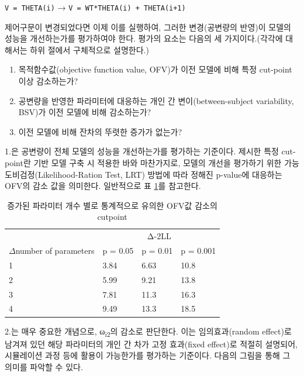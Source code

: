 \documentclass[
  11pt,
  krantz2,
  a4paper]{krantz}
\providecommand{\tightlist}{%
  \setlength{\itemsep}{0pt}\setlength{\parskip}{0pt}}
\theoremstyle{definition}
\theoremstyle{definition}
\theoremstyle{definition}
\theoremstyle{remark}
\begin{document}
\texttt{V\ =\ THETA(i)} → \texttt{V\ =\ WT*THETA(i)\ +\ THETA(i+1)}

제어구문이 변경되었다면 이제 이를 실행하여, 그러한 변경(공변량의 반영)이 모델의 성능을 개선하는가를 평가하여야 한다. 평가의 요소는 다음의 세 가지이다.(각각에 대해서는 하위 절에서 구체적으로 설명한다.)

\begin{enumerate}
\def\labelenumi{\arabic{enumi}.}
\tightlist
\item
  목적함수값(objective function value, OFV)가 이전 모델에 비해 특정 cut-point 이상 감소하는가?
\item
  공변량을 반영한 파라미터에 대응하는 개인 간 변이(between-subject variability, BSV)가 이전 모델에 비해 감소하는가?
\item
  이전 모델에 비해 잔차의 뚜렷한 증가가 없는가?
\end{enumerate}

1.은 공변량이 전체 모델의 성능을 개선하는가를 평가하는 기준이다. 제시한 특정 cut-point란 기반 모델 구축 시 적용한 바와 마찬가지로, 모델의 개선을 평가하기 위한 가능도비검정(Likelihood-Ration Test, LRT) 방법에 따라 정해진 p-value에 대응하는 OFV의 감소 값을 의미한다. 일반적으로 표 \ref{tab:cutpoint-param}를 참고한다.

\begin{table}

\caption{\label{tab:cutpoint-param}증가된 파라미터 개수 별로 통계적으로 유의한 OFV값 감소의 cutpoint}
\centering
\begin{tabular}[t]{llll}
\toprule
\multicolumn{1}{c}{ } & \multicolumn{3}{c}{Δ-2LL} \\
\cmidrule(l{3pt}r{3pt}){2-4}
$\Delta$number of parameters & p = 0.05 & p = 0.01 & p = 0.001\\
\midrule
1 & 3.84 & 6.63 & 10.8\\
2 & 5.99 & 9.21 & 13.8\\
3 & 7.81 & 11.3 & 16.3\\
4 & 9.49 & 13.3 & 18.5\\
\bottomrule
\end{tabular}
\end{table}


2.는 매우 중요한 개념으로, ω\textsubscript{i2}의 감소로 판단한다. 이는 임의효과(random effect)로 남겨져 있던 해당 파라미터의 개인 간 차가 고정 효과(fixed effect)로 적절히 설명되어, 시뮬레이션 과정 등에 활용이 가능한가를 평가하는 기준이다. 다음의 그림을 통해 그 의미를 파악할 수 있다.
\end{document}
